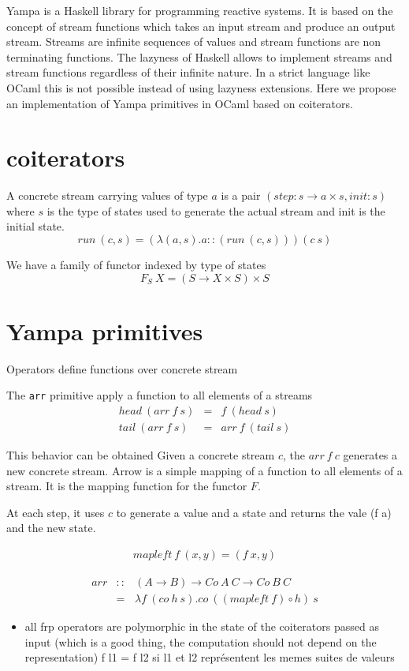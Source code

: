 \documentclass[12pt]{article}
\begin{document}
Yampa is a Haskell library for programming reactive systems. It is based
on the concept of stream functions which takes an input stream and produce an output stream.
Streams are infinite sequences of values and stream functions are non terminating functions.
The lazyness of Haskell allows to implement streams and stream functions regardless of their 
infinite nature. 
In a strict language like OCaml this is not possible instead of using lazyness extensions.
Here we propose an implementation of Yampa primitives in OCaml based on coiterators.

\section{coiterators}

A concrete stream carrying values of type $a$ 
is a pair $(step : s \rightarrow a \times s, init:s)$ where $s$
is the type of states used to generate the actual stream
and init is the initial state.
$$
    run~(c,s)= (\lambda (a, s).a::(run~(c,s)))(c~s)
$$

We have a family of functor indexed by type of states 
    $$F_S~X = (S \rightarrow X \times S) \times S$$

\section{Yampa primitives}

Operators define functions over concrete stream 

The {\tt{arr}} primitive apply a function to all elements of a streams 
$$
\begin{array}{lcl}
    head~(arr~f~s) &=& f~(head~s)\\
    tail~(arr~f~s) &=& arr~f~(tail~ s)
\end{array}
$$

This behavior can be obtained 
Given a concrete stream $c$, the $arr~f~c$ generates a new concrete
stream.
Arrow is a simple mapping of a function to all elements of a stream.
It is the mapping function for the functor $F$.

At each step, it uses $c$ to generate a value and a state 
and returns the vale (f a) and the new state.
\newcommand{\letin}[3]{{\tt{let}}~#1=#2~{\tt{in}}~#3}

$$
\begin{array}{c}
    {\mathit{mapleft}}~f~(x,y) = (f~x, y)
\end{array}
$$

$$
\begin{array}{lcl}
    arr &::& (A \rightarrow B) \rightarrow Co~A~C \rightarrow Co~B~C\\
    &=& \lambda f~(co~h~s). co~(({\mathit{mapleft}}~f) \circ h)~s
\end{array}
$$


\begin{itemize}
    \item all frp operators are polymorphic in the state of the coiterators passed as input 
    (which is a good thing, the computation should not depend on the representation)
    f l1 = f l2 si l1 et l2 représentent les memes suites de valeurs
\end{itemize}
\end{document}
